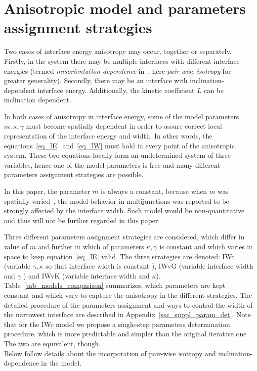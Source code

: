 \section{Anisotropic model and parameters assignment strategies}
Two cases of interface energy anisotropy may occur, together or separately. Firstly, in the system there may be multiple interfaces with different interface energies (termed \textit{misorientation dependence} in~\cite{Moelans2008}, here \textit{pair-wise isotropy} for greater generality). Secondly, there may be an interface with inclination-dependent interface energy. Additionally, the kinetic coefficient $L$ can be inclination dependent. 

In both cases of anisotropy in interface energy, some of the model parameters $m,\kappa, \gamma$ must become spatially dependent in order to assure correct local representation of the interface energy and width. In other words, the equations~\eqref{eq_IE}~and~\eqref{eq_IW} must hold in every point of the anisotropic system.
These two equations locally form an undetermined system of three variables, hence one of the model parameters is free and many different parameters assignment strategies are possible.

In this paper, the parameter $m$ is always a constant, because when $m$ was spatially varied~\cite{Moelans2008}, the model behavior in multijunctions was reported to be strongly affected by the interface width. Such model would be non-quantitative and thus will not be further regarded in this paper.

Three different parameters assignment strategies are considered, which differ in value of $m$ and further in which of parameters $\kappa,\gamma$ is constant and which varies in space to keep equation~\eqref{eq_IE} valid. The three strategies are denoted: IWc (variable $\gamma,\kappa$ so that interface width is constant  \cite{Moelans2008}), IWvG (variable interface width and $\gamma$ \cite{Ravash2017}) and IWvK (variable interface width and $\kappa$).   Table~\ref{tab_models_comparison} summarizes, which parameters are kept constant and which vary to capture the anisotropy in the different strategies. The detailed procedure of the parameters assignment and ways to control the width of the narrowest interface are described in Appendix~\ref{sec_suppl_param_det}. Note that for the IWc model we propose a single-step parameters determination procedure, which is more predictable and simpler than the original iterative one~\cite{Moelans2008}. The two are equivalent, though.\\
Below follow details about the incorporation of pair-wise isotropy and inclination-dependence in the model. 

